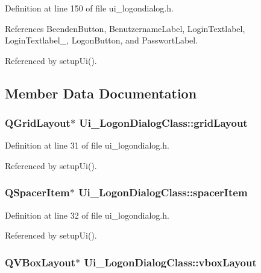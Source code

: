 Definition at line 150 of file ui\_\-logondialog.h.

References BeendenButton, BenutzernameLabel, LoginTextlabel, LoginTextlabel\_, LogonButton, and PasswortLabel.

Referenced by setupUi().

\subsection{Member Data Documentation}
\hypertarget{class_ui___logon_dialog_class_b5e37fc89aeb31e343e95b345bb02a58}{
\subsubsection[gridLayout]{\setlength{\rightskip}{0pt plus 5cm}QGridLayout$\ast$ {\bf Ui\_\-LogonDialogClass::gridLayout}}}
\label{class_ui___logon_dialog_class_b5e37fc89aeb31e343e95b345bb02a58}




Definition at line 31 of file ui\_\-logondialog.h.

Referenced by setupUi().\hypertarget{class_ui___logon_dialog_class_e246669a0868678c57146dba5fc08c46}{
\subsubsection[spacerItem]{\setlength{\rightskip}{0pt plus 5cm}QSpacerItem$\ast$ {\bf Ui\_\-LogonDialogClass::spacerItem}}}
\label{class_ui___logon_dialog_class_e246669a0868678c57146dba5fc08c46}




Definition at line 32 of file ui\_\-logondialog.h.

Referenced by setupUi().\hypertarget{class_ui___logon_dialog_class_d82710293b7240d73c8ada0cb2bf0265}{
\subsubsection[vboxLayout]{\setlength{\rightskip}{0pt plus 5cm}QVBoxLayout$\ast$ {\bf Ui\_\-LogonDialogClass::vboxLayout}}}
\label{class_ui___logon_dialog_class_d82710293b7240d73c8ada0cb2bf0265}




